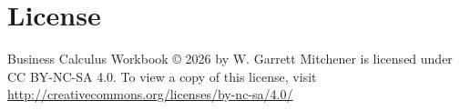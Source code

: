 \section*{License}

Business Calculus Workbook \copyright{} 2026 by W. Garrett Mitchener is licensed under CC BY-NC-SA 4.0. To view a copy of this license, visit \url{http://creativecommons.org/licenses/by-nc-sa/4.0/}

